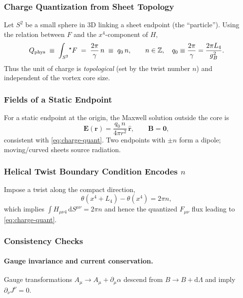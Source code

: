 \subsubsection{Charge Quantization from Sheet Topology}
Let $S^2$ be a small sphere in 3D linking a sheet endpoint (the ``particle''). Using the relation between $F$ and the $x^4$-component of $H$,
\begin{equation}
Q_{\rm phys}\;\equiv\;\int_{S^2}\! {}^\star F
\;=\;\frac{2\pi}{\gamma}\,n
\;\equiv\; q_0\, n,\qquad n\in\mathbb Z,\quad q_0\equiv\frac{2\pi}{\gamma}=\frac{2\pi L_4}{g_B^2}.
\label{eq:charge-quant}
\end{equation}
Thus the unit of charge is \emph{topological} (set by the twist number $n$) and independent of the vortex core size.

\subsubsection{Fields of a Static Endpoint}
For a static endpoint at the origin, the Maxwell solution outside the core is
\begin{equation}
\mathbf E(\mathbf r)=\frac{q_0\,n}{4\pi r^2}\,\hat{\mathbf r},\qquad \mathbf B=\mathbf 0,
\end{equation}
consistent with \eqref{eq:charge-quant}. Two endpoints with $\pm n$ form a dipole; moving/curved sheets source radiation.

\subsubsection{Helical Twist Boundary Condition Encodes $n$}
Impose a twist along the compact direction,
\begin{equation}
\theta(x^4+L_4)-\theta(x^4)=2\pi n,
\end{equation}
which implies $\int H_{\mu\nu 4}\,\mathrm dS^{\mu\nu}=2\pi n$ and hence the quantized $F_{\mu\nu}$ flux leading to \eqref{eq:charge-quant}.

\subsubsection{Consistency Checks}
\paragraph{Gauge invariance and current conservation.}
Gauge transformations $A_\mu\!\to\! A_\mu+\partial_\mu\alpha$ descend from $B\!\to\! B+\mathrm d\Lambda$ and imply $\partial_\nu J^\nu=0$.

